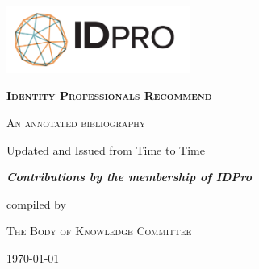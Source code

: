 \documentclass[11pt, oneside,american]{article}
\begin{document}
\begin{titlepage}
	\centering
	\includegraphics[width=0.45\textwidth]{media/idpro-logo.png}\par\vspace{1cm}
	{\scshape\huge\bfseries  Identity Professionals Recommend \par}
	\vspace{1cm}
	{\scshape\LARGE An annotated bibliography\par}
	\vspace{1.5cm}
	{\large Updated and Issued from Time to Time\par}
	\vspace{2cm}
	{\Large\itshape\bfseries Contributions by the membership of IDPro\par}
	\vfill
	compiled by\par
	\textsc{The Body of Knowledge Committee}
	\vfill
	{\large \today\par}
\end{titlepage}



\printbibliography 
\end{document}
